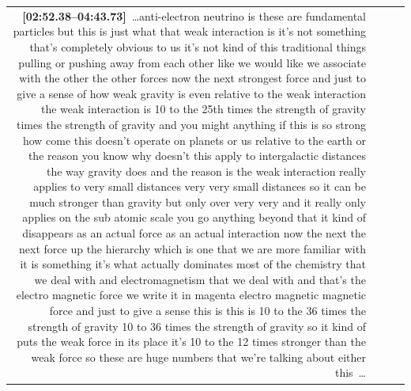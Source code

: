 \documentclass[10pt]{article}
\begin{document}
\begin{tiny}
\begin{longtable}{r p{0.3in} p{1.212in} p{3.8in}}
                                                                                                                                                                                                                   \textbf{[02:52.38--04:43.73]}~\ldots anti-electron neutrino is these are fundamental particles but this is just what that weak interaction is it's not something that's completely obvious to us it's not kind of this traditional things pulling or pushing away from each other like we would like we associate with the other the other forces now the next strongest force and just to give a sense of how weak gravity is even relative to the weak interaction the weak interaction is 10 to the 25th times the strength of gravity times the strength of gravity and you might anything if this is so strong how come this doesn't operate on planets or us relative to the earth or the reason you know why doesn't this apply to intergalactic distances the way gravity does and the reason is the weak interaction really applies to very small distances very very small distances so it can be much stronger than gravity but only over very very and it really only applies on the sub atomic scale you go anything beyond that it kind of disappears as an actual force as an actual interaction now the next the next force up the hierarchy which is one that we are more familiar with it is something it's what actually dominates most of the chemistry that we deal with and electromagnetism that we deal with and that's the electro magnetic force we write it in magenta electro magnetic magnetic force and just to give a sense this is this is 10 to the 36 times the strength of gravity 10 to 36 times the strength of gravity so it kind of puts the weak force in its place it's 10 to the 12 times stronger than the weak force so these are huge numbers that we're talking about either this~\ldots \\

\end{longtable}
\end{tiny}
\end{document}
